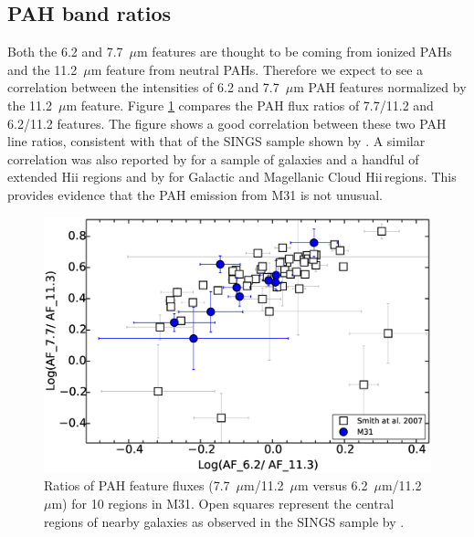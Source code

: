 
\subsection{PAH band ratios}
\label{sect:pah_ratios}

Both the 6.2 and 7.7~$\mu$m features are thought to be coming from ionized PAHs and the 11.2~$\mu$m feature from neutral PAHs. Therefore we expect to see a correlation between the intensities of 6.2 and 7.7~$\mu$m PAH features normalized by the 11.2~$\mu$m feature.  Figure \ref{PAHlines}  compares the PAH flux ratios of 7.7/11.2  and 6.2/11.2 features. The figure shows a good correlation between these two PAH line ratios, consistent with that of the SINGS sample shown by \citet{Smith:2007lr}.
A similar correlation was also reported by  \citet{Galliano2008} for a sample of galaxies and a handful of extended H{\sc ii} regions
and by \citet{Vermeij2002} for Galactic and Magellanic Cloud H{\sc ii}\,regions. This provides evidence that the PAH emission from M31 is not unusual. 


\begin{figure}
\centering
\includegraphics[scale = 0.4]{./fig8.eps}
\caption{Ratios of PAH feature fluxes (7.7~$\mu$m/11.2~$\mu$m versus 6.2~$\mu$m/11.2~$\mu$m) for 10 regions in M31.
Open squares represent the central regions of nearby galaxies as observed in the SINGS sample by \citet{Smith:2007lr}.
}
\label{PAHlines}
\end{figure}



